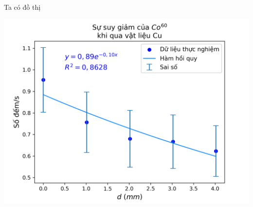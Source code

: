 \documentclass{article}
\begin{document}
Ta có đồ thị
\begin{center}
  {\includegraphics[width=\textwidth]{cu}}
\end{center}
\vspace{0.5cm}

\newpage
\end{document}
